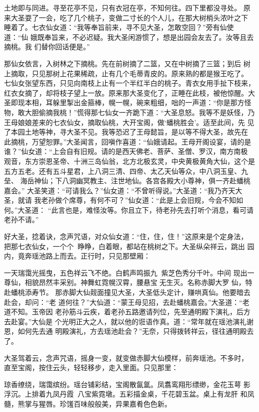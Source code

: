 土地即与同进。寻至花亭不见，只有衣冠在亭，不知何往。四下里都没寻处。
原来大圣耍了一会，吃了几个桃子，变做二寸长的个人儿，在那大树梢头浓叶之下
睡着了。七衣仙女道：“我等奉旨前来，寻不见大圣，怎敢空回？”旁有仙使道：“仙
娥既奉旨来，不必迟疑。我大圣闲游惯了，想是出园会友去了。汝等且去摘桃。我
们替你回话便是。”

那仙女依言，入树林之下摘桃。先在前树摘了二篮，又在中树摘了三篮；到后
树上摘取，只见那树上花果稀疏，止有几个毛蒂青皮的。原来熟的都是猴王吃了。
七仙女张望东西，只见向南枝上止有一个半红半白的桃子。青衣女用手扯下枝来，
红衣女摘了，却将枝子望上一放。原来那大圣变化了，正睡在此枝，被他惊醒。大
圣即现本相，耳躲里掣出金箍棒，幌一幌，碗来粗细，咄的一声道：“你是那方怪
物，敢大胆偷摘我桃！”慌得那七仙女一齐跪下道：“大圣息怒。我等不是妖怪，乃
王母娘娘差来的七衣仙女，摘取仙桃，大开宝阁，做‘蟠桃胜会’。适至此间，先
见了本园土地等神，寻大圣不见。我等恐迟了王母懿旨，是以等不得大圣，故先在
此摘桃，万望恕罪。”大圣闻言，回嗔作喜道：“仙娥请起。王母开阁设宴，请的是
谁？”仙女道：“上会自有旧规。请的是西天佛老、菩萨、圣僧、罗汉，南方南极
观音，东方崇恩圣帝、十洲三岛仙翁，北方北极玄灵，中央黄极黄角大仙，这个是
五方五老。还有五斗星君，上八洞三清、四帝、太乙天仙等众，中八洞玉皇、九垒、
海岳神仙；下八洞幽冥教主、注世地仙。各宫各殿大小尊神，俱一齐赴蟠桃嘉会。”
大圣笑道：“可请我么？”仙女道：“不曾听得说。”大圣道：“我乃齐天大圣，就请
我老孙做个席尊，有何不可？”仙女道：“此是上会旧规，今会不知如何。”大圣道：
“此言也是，难怪汝等。你且立下，待老孙先去打听个消息，看可请老孙不请。”

好大圣，捻着诀，念声咒语，对众仙女道：“住，住，住！”这原来是个定身法，
把那七衣仙女，一个个睁睁，白着眼，都站在桃树之下。大圣纵朵祥云，跳出
园内，竟奔瑶池路上而去。正行时，只见那壁厢：

一天瑞霭光摇曳，五色祥云飞不绝。白鹤声鸣振九，紫芝色秀分千叶。中间
现出一尊仙，相貌昂然丰采别。神舞虹霓幌汉霄，腰悬宝无生灭。名称赤脚大罗
仙，特赴蟠桃添寿节。
那赤脚大仙觌面撞见大圣，大圣低头定计，赚哄真仙。他要暗去赴会，却问：“老
道何往？”大仙道：“蒙王母见招，去赴蟠桃嘉会。”大圣道：“老道不知。玉帝因
老孙筋斗云疾，着老孙五路邀请列位，先至通明殿下演礼，后方去赴宴。”大仙是
个光明正大之人，就以他的诳语作真。道：“常年就在瑶池演礼谢恩，如何先去通
明殿演礼，方去瑶池赴会？”无奈，只得拨转祥云，径往通明殿去了。

大圣驾着云，念声咒语，摇身一变，就变做赤脚大仙模样，前奔瑶池。不多时，
直至宝阁，按住云头，轻轻移步，走入里面。只见那里：

琼香缭绕，瑞霭缤纷。瑶台铺彩结，宝阁散氤氲。凤翥鸾翔形缥缈，金花玉萼
影浮沉。上排着九凤丹霞，八宝紫霓墩。五彩描金桌，千花碧玉盆。桌上有龙肝
和凤髓，熊掌与猩唇。珍馐百味般般美，异果嘉肴色色新。

